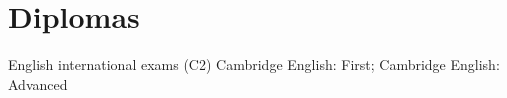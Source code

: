 \documentclass[espanol]{cv-style}     %
\begin{document}
\section{Diplomas}
   \vspace{-0.2cm}
\begin{entrylist}
\entry
{}
{English international exams (C2)}
{}
{Cambridge English: First; Cambridge English: Advanced}
\end{entrylist}
  \vspace{-0.2cm}
\end{document}

